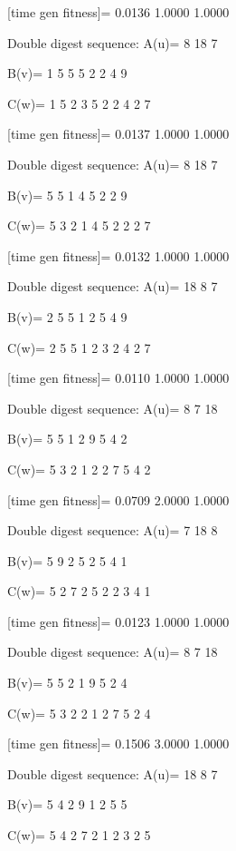 [time gen fitness]=
    0.0136    1.0000    1.0000

Double digest sequence:
A(u)=
     8    18     7

B(v)=
     1     5     5     5     2     2     4     9

C(w)=
     1     5     2     3     5     2     2     4     2     7

[time gen fitness]=
    0.0137    1.0000    1.0000

Double digest sequence:
A(u)=
     8    18     7

B(v)=
     5     5     1     4     5     2     2     9

C(w)=
     5     3     2     1     4     5     2     2     2     7

[time gen fitness]=
    0.0132    1.0000    1.0000

Double digest sequence:
A(u)=
    18     8     7

B(v)=
     2     5     5     1     2     5     4     9

C(w)=
     2     5     5     1     2     3     2     4     2     7

[time gen fitness]=
    0.0110    1.0000    1.0000

Double digest sequence:
A(u)=
     8     7    18

B(v)=
     5     5     1     2     9     5     4     2

C(w)=
     5     3     2     1     2     2     7     5     4     2

[time gen fitness]=
    0.0709    2.0000    1.0000

Double digest sequence:
A(u)=
     7    18     8

B(v)=
     5     9     2     5     2     5     4     1

C(w)=
     5     2     7     2     5     2     2     3     4     1

[time gen fitness]=
    0.0123    1.0000    1.0000

Double digest sequence:
A(u)=
     8     7    18

B(v)=
     5     5     2     1     9     5     2     4

C(w)=
     5     3     2     2     1     2     7     5     2     4

[time gen fitness]=
    0.1506    3.0000    1.0000

Double digest sequence:
A(u)=
    18     8     7

B(v)=
     5     4     2     9     1     2     5     5

C(w)=
     5     4     2     7     2     1     2     3     2     5

